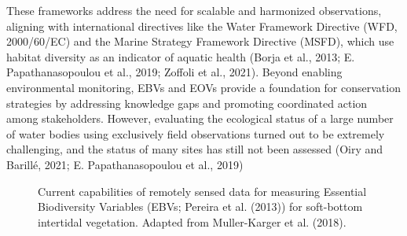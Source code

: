 \documentclass[
  letterpaper,
  11pt,
  english,
  singlespacing,
  headsepline]{MastersDoctoralThesis}
\begin{document}
\begin{spacing}{1.5}
These frameworks address the need for scalable and harmonized
observations, aligning with international directives like the Water
Framework Directive (WFD, 2000/60/EC) and the Marine Strategy Framework
Directive (MSFD), which use habitat diversity as an indicator of aquatic
health (Borja et al., 2013; E. Papathanasopoulou et al., 2019; Zoffoli
et al., 2021). Beyond enabling environmental monitoring, EBVs and EOVs
provide a foundation for conservation strategies by addressing knowledge
gaps and promoting coordinated action among stakeholders. However,
evaluating the ecological status of a large number of water bodies using
exclusively field observations turned out to be extremely challenging,
and the status of many sites has still not been assessed (Oiry and
Barillé, 2021; E. Papathanasopoulou et al., 2019)

\begin{figure}


\caption{\label{fig-MullerKarger}Current capabilities of remotely sensed
data for measuring Essential Biodiversity Variables (EBVs; Pereira et
al. (2013)) for soft-bottom intertidal vegetation. Adapted from
Muller-Karger et al. (2018).}

\end{figure}%


\end{spacing}
\end{document}
